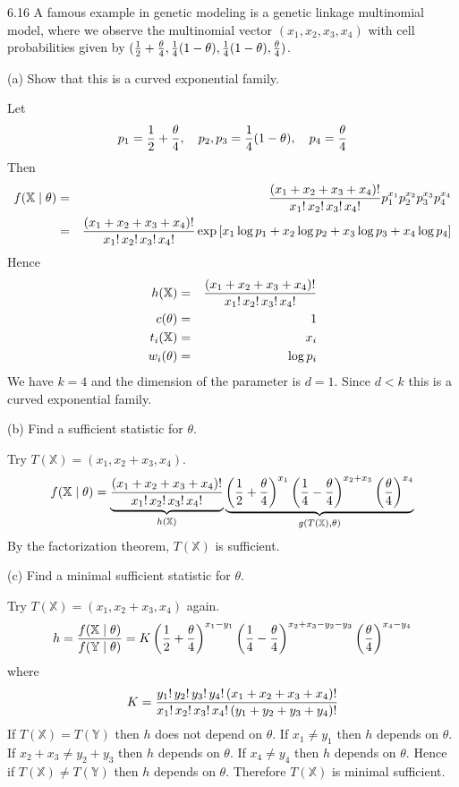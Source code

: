 \documentclass[12pt]{article}
\begin{document}
6.16
A famous example in genetic modeling is a genetic linkage
multinomial model, where we observe the multinomial vector
$(x_1,x_2,x_3,x_4)$ with cell probabilities given by
$({1\over2}+{\theta\over4},{1\over4}(1-\theta),
{1\over4}(1-\theta),{\theta\over4})$.

\bigskip
\noindent
(a) Show that this is a curved exponential family.

\bigskip
\noindent
Let
$$p_1={1\over2}+{\theta\over4},\quad
p_2,p_3={1\over4}(1-\theta),\quad
p_4={\theta\over4}
$$
Then
\begin{eqnarray*}
f(\mathbb X\mid\theta)&=&
{(x_1+x_2+x_3+x_4)!\over x_1!\,x_2!\,x_3!\,x_4!}
p_1^{x_1}
p_2^{x_2}
p_3^{x_3}
p_4^{x_4}\\
&=&{(x_1+x_2+x_3+x_4)!\over x_1!\,x_2!\,x_3!\,x_4!}
\exp\left[
x_1\log p_1
+x_2\log p_2
+x_3\log p_3
+x_4\log p_4
\right]
\end{eqnarray*}
Hence
\begin{eqnarray*}
h(\mathbb X)&=&{(x_1+x_2+x_3+x_4)!\over x_1!\,x_2!\,x_3!\,x_4!}\\
c(\theta)&=&1\\
t_i(\mathbb X)&=&x_i\\
w_i(\theta)&=&\log p_i
\end{eqnarray*}
We have $k=4$ and the dimension of the parameter is $d=1$.
Since $d<k$ this is a curved exponential family.

\bigskip
\noindent
(b) Find a sufficient statistic for $\theta$.

\bigskip
\noindent
Try $T(\mathbb X)=(x_1,x_2+x_3,x_4)$.
$$f(\mathbb X\mid\theta)
=
\underbrace{
{(x_1+x_2+x_3+x_4)!\over x_1!\,x_2!\,x_3!\,x_4!}
}_{h(\mathbb X)}
\underbrace{
\left({1\over2}+{\theta\over4}\right)^{x_1}
\left({1\over4}-{\theta\over4}\right)^{x_2+x_3}
\left({\theta\over4}\right)^{x_4}
}_{g(T(\mathbb X),\theta)}
$$
By the factorization theorem,
$T(\mathbb X)$ is sufficient.

\bigskip
\noindent
(c) Find a minimal sufficient statistic for $\theta$.

\bigskip
\noindent
Try $T(\mathbb X)=(x_1,x_2+x_3,x_4)$ again.
$$h=
{f(\mathbb X\mid\theta)\over f(\mathbb Y\mid\theta)}
=K
\left({1\over2}+{\theta\over4}\right)^{x_1-y_1}
\left({1\over4}-{\theta\over4}\right)^{x_2+x_3-y_2-y_3}
\left({\theta\over4}\right)^{x_4-y_4}
$$
where
$$K={y_1!\,y_2!\,y_3!\,y_4!\,(x_1+x_2+x_3+x_4)!\over
x_1!\,x_2!\,x_3!\,x_4!\,(y_1+y_2+y_3+y_4)!}
$$
If $T(\mathbb X)=T(\mathbb Y)$
then $h$ does not depend on $\theta$.
If $x_1\ne y_1$ then $h$ depends on $\theta$.
If $x_2+x_3\ne y_2+y_3$ then $h$ depends on $\theta$.
If $x_4\ne y_4$ then $h$ depends on $\theta$.
Hence if $T(\mathbb X)\ne T(\mathbb Y)$ then $h$ depends
on $\theta$.
Therefore $T(\mathbb X)$ is minimal sufficient.
\end{document}
